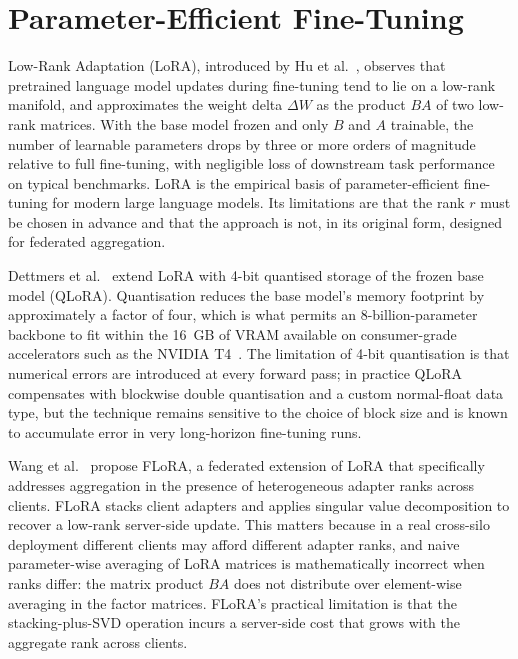 \documentclass{report}
\begin{document}
\section{Parameter-Efficient Fine-Tuning}
\label{sec:bg:peft}

Low-Rank Adaptation (LoRA), introduced by Hu et al.~\cite{hu2021lora}, observes that pretrained language model updates during fine-tuning tend to lie on a low-rank manifold, and approximates the weight delta $\Delta W$ as the product $BA$ of two low-rank matrices. With the base model frozen and only $B$ and $A$ trainable, the number of learnable parameters drops by three or more orders of magnitude relative to full fine-tuning, with negligible loss of downstream task performance on typical benchmarks. LoRA is the empirical basis of parameter-efficient fine-tuning for modern large language models. Its limitations are that the rank $r$ must be chosen in advance and that the approach is not, in its original form, designed for federated aggregation.

Dettmers et al.~\cite{dettmers2024qlora} extend LoRA with 4-bit quantised storage of the frozen base model (QLoRA). Quantisation reduces the base model's memory footprint by approximately a factor of four, which is what permits an 8-billion-parameter backbone to fit within the 16~GB of VRAM available on consumer-grade accelerators such as the NVIDIA T4~\cite{nvidia2018t4}. The limitation of 4-bit quantisation is that numerical errors are introduced at every forward pass; in practice QLoRA compensates with blockwise double quantisation and a custom normal-float data type, but the technique remains sensitive to the choice of block size and is known to accumulate error in very long-horizon fine-tuning runs.

Wang et al.~\cite{flora2024federated} propose FLoRA, a federated extension of LoRA that specifically addresses aggregation in the presence of heterogeneous adapter ranks across clients. FLoRA stacks client adapters and applies singular value decomposition to recover a low-rank server-side update. This matters because in a real cross-silo deployment different clients may afford different adapter ranks, and naive parameter-wise averaging of LoRA matrices is mathematically incorrect when ranks differ: the matrix product $BA$ does not distribute over element-wise averaging in the factor matrices. FLoRA's practical limitation is that the stacking-plus-SVD operation incurs a server-side cost that grows with the aggregate rank across clients.
\end{document}
